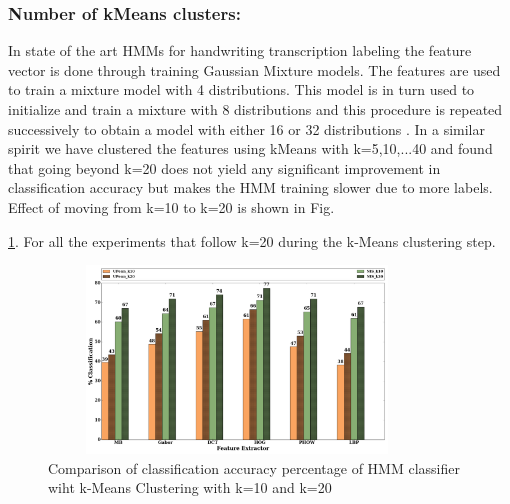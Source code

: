 \documentclass[runningheads]{llncs}
\begin{document}
\subsubsection{Number of kMeans clusters:} In state of the art HMMs for handwriting transcription labeling the feature vector is done through training Gaussian Mixture models. The features are used to train a mixture model with 4 distributions. This model is in turn used to initialize and train a mixture with 8 distributions and this procedure is repeated successively to obtain a model with either 16 or 32 distributions \cite{Young}. In a similar spirit we have clustered the features using kMeans with k=5,10,...40 and found that going beyond k=20 does not yield any significant improvement in classification accuracy but makes the HMM training slower due to more labels. Effect of moving from k=10 to k=20 is shown in Fig. {{\ref{fig:kmeans}}. For all the experiments that follow k=20 during the k-Means clustering step.
\begin{figure}[t]
\begin{minipage}[b]{1.0\linewidth}
  \centering
  \centerline{\includegraphics[width=10.0cm,height=5.0cm]{bar}}
\end{minipage}
\caption{Comparison of classification accuracy percentage of HMM classifier wiht k-Means Clustering with k=10 and k=20}
\label{fig:kmeans}
\end{figure}

}
\end{document}
